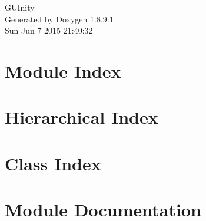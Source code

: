 \documentclass[twoside]{book}
\newcommand{\+}{\discretionary{\mbox{\scriptsize$\hookleftarrow$}}{}{}}
\newcommand{\clearemptydoublepage}{%
  \newpage{\pagestyle{empty}\cleardoublepage}%
}
\begin{document}
\hypersetup{pageanchor=false,
             bookmarks=true,
             bookmarksnumbered=true,
             pdfencoding=unicode
            }
\begin{titlepage}
\vspace*{7cm}
\begin{center}%
{\Large G\+U\+Inity }\\
\vspace*{1cm}
{\large Generated by Doxygen 1.8.9.1}\\
\vspace*{0.5cm}
{\small Sun Jun 7 2015 21:40:32}\\
\end{center}
\end{titlepage}
\clearemptydoublepage
\tableofcontents
\clearemptydoublepage
{}
\hypersetup{pageanchor=true}

\chapter{Module Index}

\chapter{Hierarchical Index}

\chapter{Class Index}

\chapter{Module Documentation}

\end{document}
